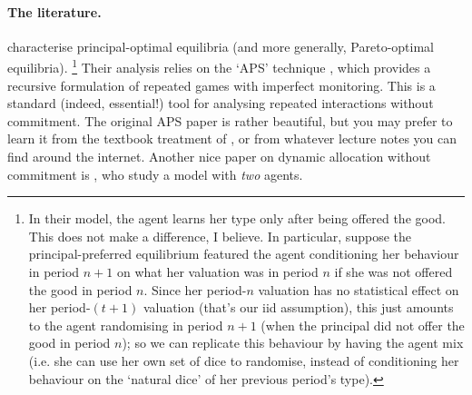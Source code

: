 \paragraph{The literature.} \textcite{LipnowskiRamos2020} characterise principal-optimal equilibria (and more generally, Pareto-optimal equilibria).%
	\footnote{In their model, the agent learns her type only after being offered the good. This does not make a difference, I believe.
	In particular, suppose the principal-preferred equilibrium featured the agent conditioning her behaviour in period $n+1$
	on what her valuation was in period $n$ if she was not offered the good in period $n$.
	Since her period-$n$ valuation has no statistical effect on her period-$(t+1)$ valuation (that's our iid assumption),
	this just amounts to the agent randomising in period $n+1$ (when the principal did not offer the good in period $n$);
	so we can replicate this behaviour by having the agent mix (i.e. she can use her own set of dice to randomise, instead of conditioning her behaviour on the `natural dice' of her previous period's type).}
Their analysis relies on the `APS' technique \parencite{AbreuPearceStacchetti1990}, which provides a recursive formulation of repeated games with imperfect monitoring. This is a standard (indeed, essential!) tool for analysing repeated interactions without commitment.
The original APS paper is rather beautiful,
but you may prefer to learn it from the textbook treatment of \textcite{MailathSamuelson2006}, or from whatever lecture notes you can find around the internet.
Another nice paper on dynamic allocation without commitment is \textcite{DeclippelEliazFershtmanRozen2021}, who study a model with \emph{two} agents.
